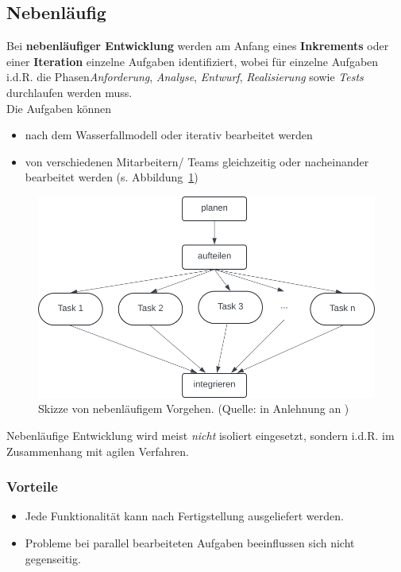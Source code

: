 \subsection{Nebenläufig}

\noindent
Bei \textbf{nebenläufiger Entwicklung} werden am Anfang eines \textbf{Inkrements} oder einer \textbf{Iteration} einzelne Aufgaben identifiziert, wobei für einzelne Aufgaben i.d.R. die Phasen\textit{Anforderung}, \textit{Analyse},  \textit{Entwurf}, \textit{Realisierung} sowie \textit{Tests} durchlaufen werden muss.\\
Die Aufgaben können
\begin{itemize}
    \item nach dem Wasserfallmodell oder iterativ bearbeitet werden
    \item von verschiedenen Mitarbeitern/ Teams gleichzeitig oder nacheinander bearbeitet werden (s. Abbildung~\ref{fig:nebenlaeufig})
\end{itemize}


\begin{figure}
    \centering
    \includegraphics[scale=0.4]{part one/Prozessmodelle/img/nebenlaeufigkeit}
    \caption{Skizze von nebenläufigem Vorgehen. (Quelle: in Anlehnung an \cite[29]{Wed09})}
    \label{fig:nebenlaeufig}
\end{figure}


\noindent
Nebenläufige Entwicklung wird meist \textit{nicht} isoliert eingesetzt, sondern i.d.R. im Zusammenhang mit agilen Verfahren.

\subsubsection*{Vorteile}

\begin{itemize}
    \item Jede Funktionalität kann nach Fertigstellung ausgeliefert werden.
    \item Probleme bei parallel bearbeiteten Aufgaben beeinflussen sich nicht gegenseitig.
\end{itemize}

